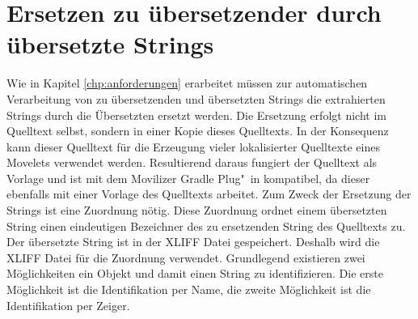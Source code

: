 \chapter{Ersetzen zu übersetzender durch übersetzte Strings}
Wie in Kapitel \ref{chp:anforderungen} erarbeitet müssen zur automatischen Verarbeitung von zu übersetzenden und übersetzten Strings die extrahierten Strings durch die Übersetzten ersetzt werden. Die Ersetzung erfolgt nicht im Quelltext selbst, sondern in einer Kopie dieses Quelltexts. In der Konsequenz kann dieser Quelltext für die Erzeugung vieler lokalisierter Quelltexte eines Movelets verwendet werden. Resultierend daraus fungiert der Quelltext als Vorlage und ist mit dem Movilizer Gradle Plug"~in kompatibel, da dieser ebenfalls mit einer Vorlage des Quelltexts arbeitet.
\autocite[Vgl.][]{Mula.2018}
Zum Zweck der Ersetzung der Strings ist eine Zuordnung nötig. Diese Zuordnung ordnet einem übersetzten String einen eindeutigen Bezeichner des zu ersetzenden String des Quelltexts zu. Der übersetzte String ist in der \ac{XLIFF} Datei gespeichert. Deshalb wird die \ac{XLIFF} Datei für die Zuordnung verwendet.
Grundlegend existieren zwei Möglichkeiten ein Objekt und damit einen String zu identifizieren. Die erste Möglichkeit ist die Identifikation per Name, die zweite Möglichkeit ist die Identifikation per Zeiger.
\autocite[Vgl.][S. 6]{BernersLee.2005}
